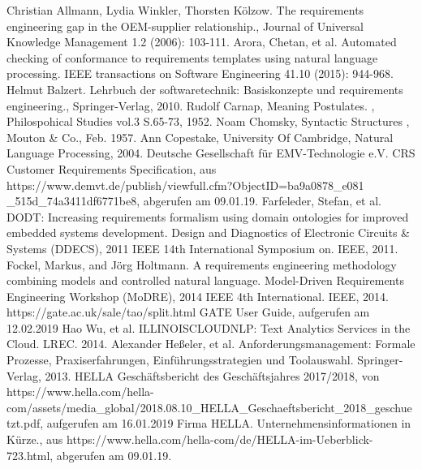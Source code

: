 \documentclass[12pt]{report}
\begin{document}
\newpage
\begin{thebibliography}{20}
 Christian Allmann, Lydia Winkler, Thorsten Kölzow. \glqq The requirements engineering gap in the OEM-supplier relationship.\grqq , Journal of Universal Knowledge Management 1.2 (2006): 103-111.
Arora, Chetan, et al. \glqq Automated checking of conformance to requirements templates using natural language processing.\grqq{} IEEE transactions on Software Engineering 41.10 (2015): 944-968.
Helmut Balzert. \glqq Lehrbuch der softwaretechnik: Basiskonzepte und requirements engineering.\grqq , Springer-Verlag, 2010.
Rudolf Carnap, \glqq  Meaning Postulates.\grqq{} , Philospohical Studies vol.3 S.65-73, 1952.
 Noam Chomsky, \glqq  Syntactic Structures\grqq{} , Mouton \& Co., Feb. 1957.
Ann Copestake, University Of Cambridge, \glqq Natural Language Processing\grqq , 2004.
 Deutsche Gesellschaft für EMV-Technologie e.V. \glqq CRS Customer Requirements Specification\grqq, aus https://www.demvt.de/publish/viewfull.cfm?ObjectID=ba9a0878\_e081\\ \_515d\_74a3411df6771be8, abgerufen am 09.01.19.
 Farfeleder, Stefan, et al. \glqq DODT: Increasing requirements formalism using domain ontologies for improved embedded systems development. \grqq{} Design and Diagnostics of Electronic Circuits \& Systems (DDECS), 2011 IEEE 14th International Symposium on. IEEE, 2011.
 Fockel, Markus, and Jörg Holtmann. \glqq A requirements engineering methodology combining models and controlled natural language.\grqq{} Model-Driven Requirements Engineering Workshop (MoDRE), 2014 IEEE 4th International. IEEE, 2014.
 https://gate.ac.uk/sale/tao/split.html GATE User Guide, aufgerufen am 12.02.2019
 Hao Wu, et al. \glqq  ILLINOISCLOUDNLP: Text Analytics Services in the Cloud.\grqq{}  LREC. 2014.
 Alexander Heßeler, et al. \glqq Anforderungsmanagement: Formale Prozesse, Praxiserfahrungen, Einführungsstrategien und Toolauswahl.\grqq{} Springer-Verlag, 2013.
 HELLA Geschäftsbericht des Geschäftsjahres 2017/2018, von https://www.hella.com/hella-com/assets/media\_global/2018.08.10\_HELLA\_Geschaeftsbericht\_2018\_geschuetzt.pdf, aufgerufen am 16.01.2019
Firma HELLA. \glqq Unternehmensinformationen in Kürze.\grqq , aus https://www.hella.com/hella-com/de/HELLA-im-Ueberblick-723.html, abgerufen am 09.01.19.

\end{thebibliography}
\end{document}
